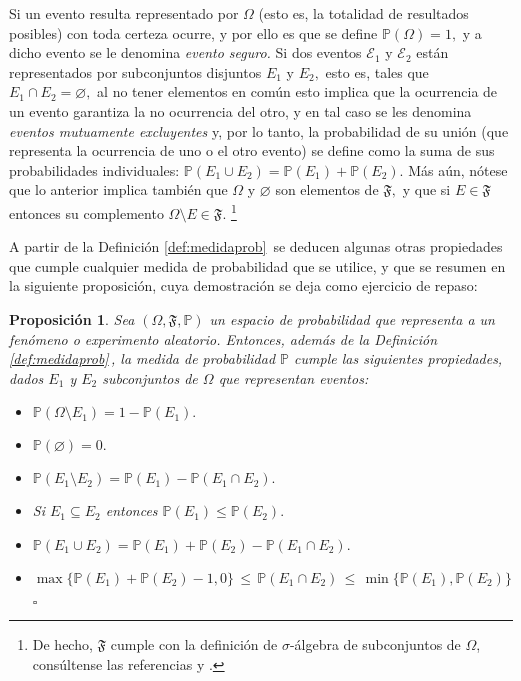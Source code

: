\documentclass[spanish,10pt,letterpaper]{article}
\newtheorem{prop}{Proposición}
\newcommand{\prob}{\mathbb{P}}
\newcommand{\qed}{\begin{flushright}$\square$\end{flushright}}
\begin{document}
		
	Si un evento resulta representado por $\Omega$ (esto es, la totalidad de resultados posibles) con toda certeza ocurre, y por ello es que se define $\prob(\Omega)=1,$ y a dicho evento se le denomina \textit{evento seguro.} Si dos eventos $\mathcal{E}_1$ y $\mathcal{E}_2$ están representados por subconjuntos disjuntos $E_1$ y $E_2,$ esto es, tales que $E_1\cap E_2=\varnothing,$ al no tener elementos en común esto implica que la ocurrencia de un evento garantiza la no ocurrencia del otro, y en tal caso se les denomina \textit{eventos mutuamente excluyentes} y, por lo tanto, la probabilidad de su unión (que representa la ocurrencia de uno o el otro evento) se define como la suma de sus probabilidades individuales: $\prob(E_1\cup E_2)=\prob(E_1)+\prob(E_2).$ Más aún, nótese que lo anterior implica también que $\Omega$ y  $\varnothing$ son elementos de $\mathfrak{F},$ y que si $E\in\mathfrak{F}$ entonces su complemento $\Omega\setminus E\in\mathfrak{F}.$ \footnote{De hecho, $\mathfrak{F}$ cumple con la definición de $\sigma$-álgebra de subconjuntos de $\Omega$, consúltense las referencias \cite{Domínguez} y \cite{Grimmett}.}
	
	\medskip 
	
	A partir de la Definición \ref{def:medidaprob}\, se deducen algunas otras propiedades que cumple cualquier medida de probabilidad que se utilice, y que se resumen en la siguiente proposición, cuya demostración se deja como ejercicio de repaso:
	
	\bigskip 
	
	\begin{prop}\label{prop:medidasprob}
		Sea $(\Omega, \mathfrak{F}, \prob)$ un espacio de probabilidad que representa a un fenómeno o experimento aleatorio. Entonces, además de la Definición \ref{def:medidaprob}\,, la medida de probabilidad $\prob$ cumple las siguientes propiedades, dados $E_1$ y $E_2$ subconjuntos de $\Omega$ que representan eventos:
		\begin{itemize}
			\item[a)] $\prob(\Omega\setminus E_1)=1-\prob(E_1).$
			\item[b)] $\prob(\varnothing)=0.$
			\item[c)] $\prob(E_1\setminus E_2)=\prob(E_1)-\prob(E_1\cap E_2).$
			\item[d)] Si $E_1\subseteq E_2$ entonces $\prob(E_1)\leq\prob(E_2).$
			\item[e)] $\prob(E_1\cup E_2)=\prob(E_1)+\prob(E_2)-\prob(E_1\cap E_2).$ 
			\item[f)] $\max\{\prob(E_1)+\prob(E_2)-1,0\}\,\leq\,\prob(E_1\cap E_2)\,\leq\,\min\{\prob(E_1),\prob(E_2)\}$ \qed 
		\end{itemize}
	\end{prop}
	
\end{document}
